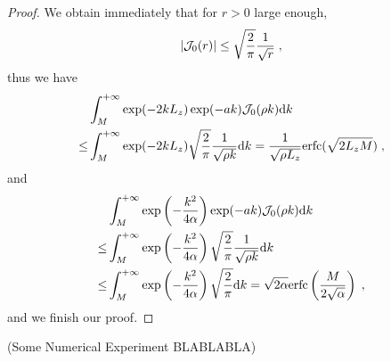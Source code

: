 \begin{proof}
We obtain immediately that for $r>0$ large enough,     
\begin{equation*}
   \left\lvert\mathcal{J}_0(r)\right\rvert\leq \sqrt{\frac{2}{\pi}} \frac{1}{\sqrt{r}}\;, 
\end{equation*}
thus we have 
\begin{align*}
   & \int_M^{+\infty}  \exp(-2kL_z)\exp(-ak) \mathcal{J}_0(\rho k)\mathrm{d} k \\
\leq & \int_M^{+\infty}  \exp(-2kL_z)\sqrt{\frac{2}{\pi}} \frac{1}{\sqrt{\rho k}} \mathrm{d} k=\frac{1}{\sqrt{\rho L_z}}\mathrm{erfc}(\sqrt{2L_zM})\;,
\end{align*}
and 
\begin{align*}
  &\int_M^{+\infty}  \exp\left(-\frac{k^2}{4\alpha}\right)  \exp(-ak) \mathcal{J}_0(\rho k)\mathrm{d} k \\
  \leq &\int_M^{+\infty} \exp\left(-\frac{k^2}{4\alpha}\right)\sqrt{\frac{2}{\pi}} \frac{1}{\sqrt{\rho k}} \mathrm{d} k\\ 
  \leq &\int_M^{+\infty} \exp\left(-\frac{k^2}{4\alpha}\right)\sqrt{\frac{2}{\pi}} \mathrm{d} k=\sqrt{2\alpha} \mathrm{erfc}\left(\frac{M}{2\sqrt{\alpha}}\right)\;,
\end{align*}
and we finish our proof.
\end{proof}
(Some Numerical Experiment BLABLABLA)
